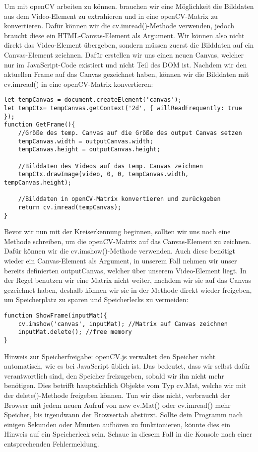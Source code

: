 \documentclass{article}
\begin{document}
Um mit openCV arbeiten zu können. brauchen wir eine Möglichkeit die Bilddaten aus dem Video-Element zu extrahieren und in eine openCV-Matrix zu konvertieren. Dafür können wir die cv.imread()-Methode verwenden, jedoch braucht diese ein HTML-Canvas-Element als Argument. Wir können also nicht direkt das Video-Element übergeben, sondern müssen zuerst die Bilddaten auf ein Canvas-Element zeichnen. Dafür erstellen wir uns einen neuen Canvas, welcher nur im JavaScript-Code existiert und nicht Teil des DOM ist. Nachdem wir den aktuellen Frame auf das Canvas gezeichnet haben, können wir die Bilddaten mit cv.imread() in eine openCV-Matrix konvertieren:

\begin{lstlisting}[style=JavaScript]
let tempCanvas = document.createElement('canvas');
let tempCtx= tempCanvas.getContext('2d', { willReadFrequently: true });
function GetFrame(){
    //Größe des temp. Canvas auf die Größe des output Canvas setzen
    tempCanvas.width = outputCanvas.width;
    tempCanvas.height = outputCanvas.height;

    //Bilddaten des Videos auf das temp. Canvas zeichnen
    tempCtx.drawImage(video, 0, 0, tempCanvas.width, tempCanvas.height);

    //Bilddaten in openCV-Matrix konvertieren und zurückgeben
    return cv.imread(tempCanvas);
}
\end{lstlisting}

Bevor wir nun mit der Kreiserkennung beginnen, sollten wir uns noch eine Methode schreiben, um die openCV-Matrix auf das Canvas-Element zu zeichnen. Dafür können wir die cv.imshow()-Methode verwenden. Auch diese benötigt wieder ein Canvas-Element als Argument, in unserem Fall nehmen wir unser bereits definierten outputCanvas, welcher über unserem Video-Element liegt. In der Regel benutzen wir eine Matrix nicht weiter, nachdem wir sie auf das Canvas gezeichnet haben, deshalb können wir sie in der Methode direkt wieder freigeben, um Speicherplatz zu sparen und Speicherlecks zu vermeiden:

\begin{lstlisting}[style=JavaScript]
function ShowFrame(inputMat){
    cv.imshow('canvas', inputMat); //Matrix auf Canvas zeichnen
    inputMat.delete(); //free memory
}
\end{lstlisting}

Hinweis zur Speicherfreigabe: openCV.js verwaltet den Speicher nicht automatisch, wie es bei JavaScript üblich ist. Das bedeutet, dass wir selbst dafür verantwortlich sind, den Speicher freizugeben, sobald wir ihn nicht mehr benötigen. Dies betrifft hauptsächlich Objekte vom Typ cv.Mat, welche wir mit der delete()-Methode freigeben können. Tun wir dies nicht, verbraucht der Browser mit jedem neuen Aufruf von new cv.Mat() oder cv.imread() mehr Speicher, bis irgendwann der Browsertab abstürzt. Sollte dein Programm nach einigen Sekunden oder Minuten aufhören zu funktionieren, könnte dies ein Hinweis auf ein Speicherleck sein. Schaue in diesem Fall in die Konsole nach einer entsprechenden Fehlermeldung.
\end{document}

